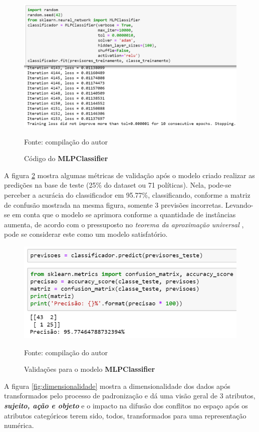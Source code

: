 \begin{figure}[h!]
	\centering
	\includegraphics[width=.7\textwidth]{imagens/mlp_classifier.png}
	\caption{Código do \textbf{MLPClassifier}}
	\label{fig:mlp_classifier}
	{\scriptsize Fonte: compilação do autor}
\end{figure}

A figura \ref{fig:validacao_notebook} mostra algumas métricas de validação após o modelo criado realizar as predições na base de teste (25\% do dataset ou 71 políticas). Nela, pode-se perceber a acurácia do classificador em 95.77\%, classificando, conforme a matriz de confusão mostrada na mesma figura, somente 3 previsões incorretas. Levando-se em conta que o modelo se aprimora conforme a quantidade de instâncias aumenta, de acordo com o pressuposto no\textit{ teorema da aproximação universal} \cite{hagan_neural_1996}, pode se considerar este como um modelo satisfatório.

\begin{figure}[h!]
	\centering
	\includegraphics[width=.6\textwidth]{imagens/validacao_notebook.png}
	\caption{Validações para o modelo \textbf{MLPClassifier}}
	\label{fig:validacao_notebook}
	{\scriptsize Fonte: compilação do autor}
\end{figure}

A figura \ref{fig:dimensionalidade} mostra a dimensionalidade dos dados após transformados pelo processo de padronização e dá uma visão geral de 3 atributos, \textit{\textbf{sujeito, ação e objeto}} e o impacto na difusão dos conflitos no espaço após os atributos categóricos terem sido, todos, transformados para uma representação numérica.

